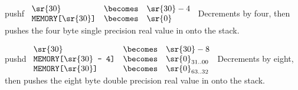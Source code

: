 \begin{instruction}{pushf}\label{inst:pushf}
     {\pushfopc}
     {
       \begin{math}
         \begin{array}{lcl}
           \sr{30}                           & \becomes & \sr{30} - 4 \\
           \texttt{MEMORY[\textrm{\sr{30}}]} & \becomes & {\sr{0}} \\
         \end{array}
       \end{math}
     }
     {
       Decrements  by four, then pushes the four byte single
       precision real value in  onto the stack.
     }
\end{instruction}

\begin{instruction}{pushd}\label{inst:pushd}
     {\pushdopc}
     {
       \begin{math}
         \begin{array}{lcl}
           \sr{30}                           & \becomes & \sr{30} - 8 \\
           \texttt{MEMORY[\textrm{\sr{30}} - 4]} & \becomes & {\sr{0}}_{31..00} \\
           \texttt{MEMORY[\textrm{\sr{30}}]} & \becomes & {\sr{0}}_{63..32} \\
         \end{array}
       \end{math}
     }
     {
       Decrements  by eight, then pushes the eight byte double
       precision real value in  onto the stack.
     }
\end{instruction}


